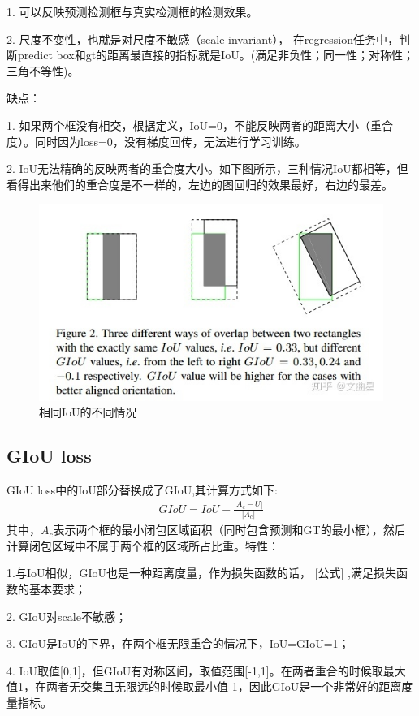 \documentclass{article}
\begin{document}
1. 可以反映预测检测框与真实检测框的检测效果。

2. 尺度不变性，也就是对尺度不敏感（scale invariant）， 在regression任务中，判断predict box和gt的距离最直接的指标就是IoU。(满足非负性；同一性；对称性；三角不等性)。

缺点：

1. 如果两个框没有相交，根据定义，IoU=0，不能反映两者的距离大小（重合度）。同时因为loss=0，没有梯度回传，无法进行学习训练。

2. IoU无法精确的反映两者的重合度大小。如下图所示，三种情况IoU都相等，但看得出来他们的重合度是不一样的，左边的图回归的效果最好，右边的最差。
\begin{figure}[htp]
\centering
\includegraphics[scale=0.5]{images/IoU.jpg}
\caption{相同IoU的不同情况}
\label{Fig.IoU}
\end{figure}

\subsection{GIoU loss}
GIoU loss中的IoU部分替换成了GIoU,其计算方式如下:
\begin{align}
GIoU = IoU - \frac{\left| A_c - U \right|}{\left| A_c \right|}
\end{align}
其中，$A_c$表示两个框的最小闭包区域面积（同时包含预测和GT的最小框），然后计算闭包区域中不属于两个框的区域所占比重。特性：

1.与IoU相似，GIoU也是一种距离度量，作为损失函数的话， [公式] ,满足损失函数的基本要求；

2. GIoU对scale不敏感； 

3. GIoU是IoU的下界，在两个框无限重合的情况下，IoU=GIoU=1；

4. IoU取值[0,1]，但GIoU有对称区间，取值范围[-1,1]。在两者重合的时候取最大值1，在两者无交集且无限远的时候取最小值-1，因此GIoU是一个非常好的距离度量指标。
\end{document}
